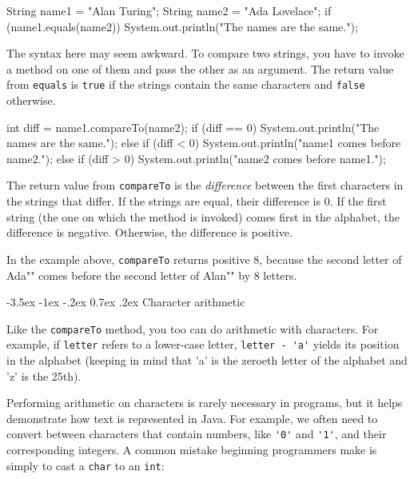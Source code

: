 \documentclass[12pt]{book}
\makeatletter
\theoremstyle{exercise}
\newcommand{\java}[1]{\verb"#1"}
\renewcommand{\section}{\@startsection{section}{1}{\z@}%
    {-3.5ex \@plus -1ex \@minus -.2ex}%
    {0.7ex \@plus.2ex}%
    {\normalfont\Large\bfseries}}
\newcommand{\java}[1]{\lstinline{#1}} %
\makeatother
\begin{document}
\begin{code}
    String name1 = "Alan Turing";
    String name2 = "Ada Lovelace";
    if (name1.equals(name2)) {
        System.out.println("The names are the same.");
    }
\end{code}

The syntax here may seem awkward.
To compare two strings, you have to invoke a method on one of them and pass the other as an argument.
The return value from \java{equals} is \java{true} if the strings contain the same characters and \java{false} otherwise.

\begin{code}
    int diff = name1.compareTo(name2);
    if (diff == 0) {
        System.out.println("The names are the same.");
    } else if (diff < 0) {
        System.out.println("name1 comes before name2.");
    } else if (diff > 0) {
        System.out.println("name2 comes before name1.");
    }
\end{code}

The return value from \java{compareTo} is the {\em difference} between the first characters in the strings that differ.
If the strings are equal, their difference is 0.
If the first string (the one on which the method is invoked) comes first in the alphabet, the difference is negative.
Otherwise, the difference is positive.

In the example above, \java{compareTo} returns positive 8, because the second letter of \java{"Ada"} comes before the second letter of \java{"Alan"} by 8 letters.


\section{Character arithmetic}

Like the \java{compareTo} method, you too can do arithmetic with characters.
For example, if \java{letter} refers to a lower-case letter, \java{letter - 'a'} yields its position in the alphabet (keeping in mind that 'a' is the zeroeth letter of the alphabet and 'z' is the 25th).

Performing arithmetic on characters is rarely necessary in programs, but it helps demonstrate how text is represented in Java.
For example, we often need to convert between characters that contain numbers, like \java{'0'} and \java{'1'}, and their corresponding integers.
A common mistake beginning programmers make is simply to cast a \java{char} to an \java{int}:
\end{document}
